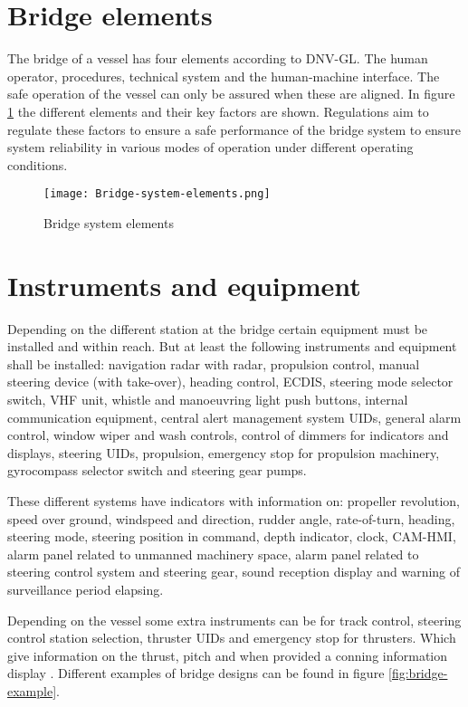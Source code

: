 \newpage
\section{Bridge elements}
The bridge of a vessel has four elements according to DNV-GL. The human operator, procedures, technical system and the human-machine interface. The safe operation of the vessel can only be assured when these are aligned. In figure \ref{fig:Bridge-system-elements} the different elements and their key factors are shown. Regulations aim to regulate these factors to ensure a safe performance of the bridge system to ensure system reliability in various modes of operation under different operating conditions. \cite{DNVGL2011}
\begin{figure}[H]
	\centering
	\texttt{[image: Bridge-system-elements.png]}
	\caption{Bridge system elements}
	\label{fig:Bridge-system-elements}
\end{figure}

\section{Instruments and equipment}
Depending on the different station at the bridge certain equipment must be installed and within reach. But at least the following instruments and equipment shall be installed: navigation radar with radar, propulsion control, manual steering device (with take-over), heading control, \ac{ECDIS}, steering mode selector switch, \ac{VHF} unit, whistle and manoeuvring light push buttons, internal communication equipment, central alert management system \ac{UID}s, general alarm control, window wiper and wash controls, control of dimmers for indicators and displays, steering \ac{UID}s, propulsion, emergency stop for propulsion machinery, gyrocompass selector switch and steering gear pumps.

These different systems have indicators with information on: propeller revolution, speed over ground, windspeed and direction, rudder angle, rate-of-turn, heading, steering mode, steering position in command, depth indicator, clock, \ac{CAM-HMI}, alarm panel related to unmanned machinery space, alarm panel related to steering control system and steering gear, sound reception display and warning of surveillance period elapsing. 

Depending on the vessel some extra instruments can be for track control, steering control station selection, thruster \ac{UID}s and emergency stop for thrusters. Which give information on the thrust, pitch and when provided a conning information display  \cite{DNVGL2017}. Different examples of bridge designs can be found in figure \ref{fig:bridge-example}.

